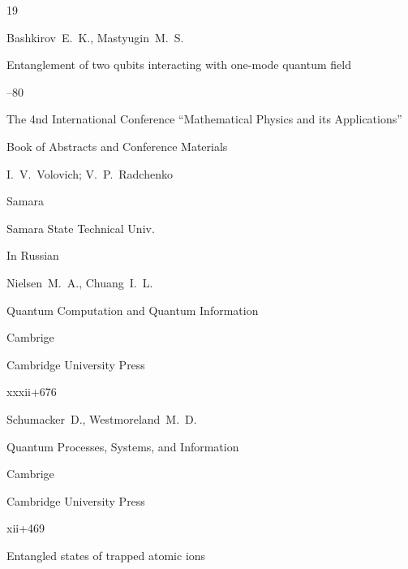 \begin{thebibliography}{19}




\by  Bashkirov~E.~K., Mastyugin~M.~S.

\paper Entanglement of two qubits interacting with one-mode quantum field

--80

\inbook  The 4nd International Conference ``Mathematical Physics and its Applications''

\bookinfo Book of Abstracts and Conference Materials

\eds I.~V.~Volovich; V.~P.~Radchenko

\publaddr Samara

\publ Samara State Technical Univ.


\lang In Russian








\by Nielsen~M.~A., Chuang~I.~L.

\book Quantum Computation and Quantum Information

\publaddr Cambrige

\publ Cambridge University Press



\totalpages xxxii+676




\by Schumacker~D.,  Westmoreland~M.~D.

\book Quantum Processes, Systems, and Information

\publaddr Cambrige

\publ Cambridge University Press


\totalpages xii+469











\paper Entangled states of trapped atomic ions


\end{thebibliography}

